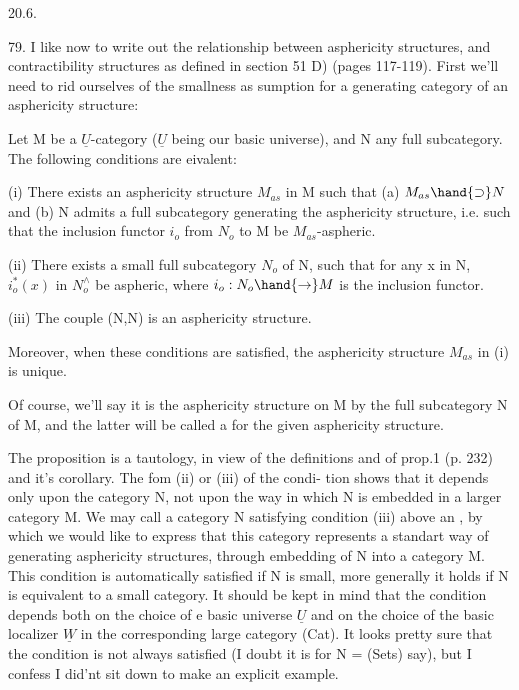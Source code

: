 20.6.

79. I  like now to write out the relationship between asphericity
structures, and contractibility structures as defined in section 51 D)
(pages 117-119). First we'll need to rid ourselves of the smallness as%
sumption for a generating category of an asphericity structure:

 Let M be a $\underline{U}$-category ($\underline{U}$ being our basic universe), and N
any full subcategory. The following conditions are eivalent:

(i) There exists an asphericity structure $M_{as}$ in M such that
(a) $M_{as}\hand{\supset} N$ and (b) N admits a \hand{\uline{\textcolor{black}{small}}} full subcategory generating
the asphericity structure, i.e. such that the inclusion functor $i_o$ from
$N_o$ to M be $M_{as}$-aspheric.

(ii) There exists a small full subcategory $N_o$ of N, such that for
any x in N, $i_o^{*}(x)$ in $N_o^{\wedge}$ be aspheric, where $i_o : N_o \hand{\to} M$ is the inclusion
functor.

(iii) The couple (N,N) is an asphericity structure.

Moreover, when these conditions are satisfied, the asphericity
structure $M_{as}$ in (i) is unique.

Of course, we'll say it is the asphericity structure on M \hand{\uline{\textcolor{black}{genera-%
ted}}} by the full subcategory N of M, and the latter will be called a
\hand{\uline{\textcolor{black}{generating}}} \hand{\uline{\textcolor{black}{subcategory}}} for the given asphericity structure.

The proposition is a tautology, in view of the definitions and of
prop.1 (p. 232) and it's corollary. The fom (ii) or (iii) of the condi-%
tion shows that it depends only upon the category N, not upon the way
in which N is embedded in a larger category M. We may call a category N
satisfying condition (iii) above an \hand{\uline{\textcolor{black}{aspherator}}} , by which we would like
to express that this category represents a standart way of generating
asphericity structures, through  embedding of N into a category M.
This condition is automatically satisfied if N is small, more generally
it holds if N is equivalent to a small category. It should be kept in
mind that the condition depends both on the choice of e basic universe
$\underline{U}$ and on the choice of the basic localizer $\underline{W}$ in the corresponding large
category (Cat). It looks pretty sure that the condition is not always
satisfied (I doubt it is for N = (Sets) say), but I confess I did'nt
sit down to make an explicit example.

